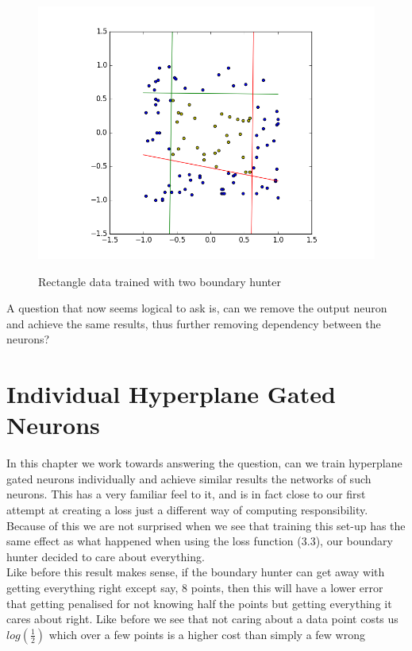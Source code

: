 \documentclass[notitlepage]{report}
\theoremstyle{definition}
\begin{document}
\begin{figure}[H]
  \centering
  \begin{minipage}[b]{0.8\textwidth}
    \includegraphics[width=\textwidth]{RecData-2HP.png}
    \caption{}
  \end{minipage}
  \hfill

Rectangle data trained with two boundary hunter
\end{figure}

A question that now seems logical to ask is, can we remove the output neuron and achieve the same results, thus further removing dependency between the neurons?

\chapter{Individual Hyperplane Gated Neurons}
In this chapter we work towards answering the question, can we train hyperplane gated neurons individually and achieve similar results the networks of such neurons. This has a very familiar feel to it, and is in fact close to our first attempt at creating a loss just a different way of computing responsibility. Because of this we are not surprised when we see that training this set-up has the same effect as what happened when using the loss function (3.3), our boundary hunter decided to care about everything.\\

Like before this result makes sense, if the boundary hunter can get away with getting everything right except say, 8 points, then this will have a lower error that getting penalised for not knowing half the points but getting everything it cares about right. Like before we see that not caring about a data point costs us $log(\frac{1}{2})$ which over a few points is a higher cost than simply a few wrong\\
\end{document}
